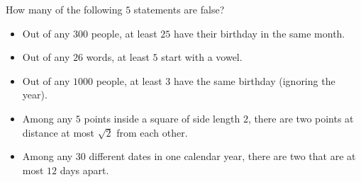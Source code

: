 How many of the following $5$ statements are false?
\begin{itemize}
\item Out of any $300$ people, at least $25$ have their birthday in the same month.
\item Out of any $26$ words, at least $5$ start with a vowel.
\item Out of any $1000$ people, at least $3$ have the same birthday (ignoring the year).
\item Among any $5$ points inside a square of side length $2$, there are two points at distance at most $\sqrt2$ from each other.
\item Among any $30$ different dates in one calendar year, there are two that are at most $12$ days apart.
\end{itemize}
